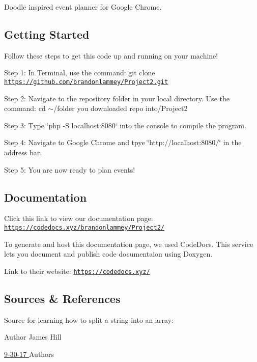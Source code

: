Doodle inspired event planner for Google Chrome.

\subsection*{Getting Started}

Follow these steps to get this code up and running on your machine!

Step 1\+: In Terminal, use the command\+: git clone \href{https://github.com/brandonlammey/Project2.git}{\tt https\+://github.\+com/brandonlammey/\+Project2.\+git}

Step 2\+: Navigate to the repository folder in your local directory. Use the command\+: cd $\sim$/folder you downloaded repo into/\+Project2

Step 3\+: Type \char`\"{}php -\/\+S localhost\+:8080\char`\"{} into the console to compile the program.

Step 4\+: Navigate to Google Chrome and tpye \char`\"{}http\+://localhost\+:8080/\char`\"{} in the address bar.

Step 5\+: You are now ready to plan events!

\subsection*{Documentation}

Click this link to view our documentation page\+: \href{https://codedocs.xyz/brandonlammey/Project2/}{\tt https\+://codedocs.\+xyz/brandonlammey/\+Project2/}

To generate and host this documentation page, we used Code\+Docs. This service lets you document and publish code documentaion using Doxygen.

Link to their website\+: \href{https://codedocs.xyz/}{\tt https\+://codedocs.\+xyz/}

\subsection*{Sources \& References}

Source for learning how to split a string into an array\+:
\begin{DoxyItemize}
\item \begin{DoxyAuthor}{Author}
James Hill
\end{DoxyAuthor}

\item \hyperlink{}{9-\/30-\/17 }Authors
\end{DoxyItemize}

